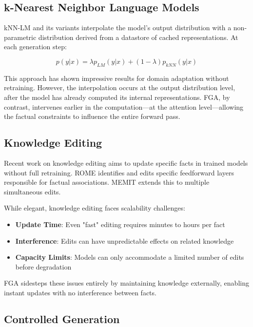 \documentclass[11pt, a4paper]{article}
\theoremstyle{definition}
\begin{document}
\subsection{k-Nearest Neighbor Language Models}

kNN-LM \cite{khandelwal2019generalization} and its variants interpolate the model's output distribution with a non-parametric distribution derived from a datastore of cached representations. At each generation step:

$$p(y|x) = \lambda p_{LM}(y|x) + (1-\lambda) p_{kNN}(y|x)$$

This approach has shown impressive results for domain adaptation without retraining. However, the interpolation occurs at the output distribution level, after the model has already computed its internal representations. FGA, by contrast, intervenes earlier in the computation—at the attention level—allowing the factual constraints to influence the entire forward pass.

\subsection{Knowledge Editing}

Recent work on knowledge editing \cite{mitchell2021fast, meng2022locating} aims to update specific facts in trained models without full retraining. ROME \cite{meng2022locating} identifies and edits specific feedforward layers responsible for factual associations. MEMIT \cite{meng2023memit} extends this to multiple simultaneous edits.

While elegant, knowledge editing faces scalability challenges:
\begin{itemize}
    \item \textbf{Update Time}: Even "fast" editing requires minutes to hours per fact
    \item \textbf{Interference}: Edits can have unpredictable effects on related knowledge
    \item \textbf{Capacity Limits}: Models can only accommodate a limited number of edits before degradation
\end{itemize}

FGA sidesteps these issues entirely by maintaining knowledge externally, enabling instant updates with no interference between facts.

\subsection{Controlled Generation}
\end{document}

